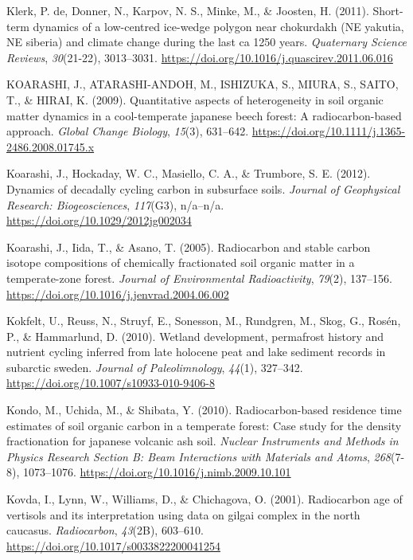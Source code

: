 \documentclass[]{article}
\begin{document}
\leavevmode\hypertarget{ref-de_Klerk_2011}{}%
Klerk, P. de, Donner, N., Karpov, N. S., Minke, M., \& Joosten, H.
(2011). Short-term dynamics of a low-centred ice-wedge polygon near
chokurdakh (NE yakutia, NE siberia) and climate change during the last
ca 1250 years. \emph{Quaternary Science Reviews}, \emph{30}(21-22),
3013--3031. \url{https://doi.org/10.1016/j.quascirev.2011.06.016}

\leavevmode\hypertarget{ref-KOARASHI_2009}{}%
KOARASHI, J., ATARASHI-ANDOH, M., ISHIZUKA, S., MIURA, S., SAITO, T., \&
HIRAI, K. (2009). Quantitative aspects of heterogeneity in soil organic
matter dynamics in a cool-temperate japanese beech forest: A
radiocarbon-based approach. \emph{Global Change Biology}, \emph{15}(3),
631--642. \url{https://doi.org/10.1111/j.1365-2486.2008.01745.x}

\leavevmode\hypertarget{ref-Koarashi_2012}{}%
Koarashi, J., Hockaday, W. C., Masiello, C. A., \& Trumbore, S. E.
(2012). Dynamics of decadally cycling carbon in subsurface soils.
\emph{Journal of Geophysical Research: Biogeosciences}, \emph{117}(G3),
n/a--n/a. \url{https://doi.org/10.1029/2012jg002034}

\leavevmode\hypertarget{ref-Koarashi_2005}{}%
Koarashi, J., Iida, T., \& Asano, T. (2005). Radiocarbon and stable
carbon isotope compositions of chemically fractionated soil organic
matter in a temperate-zone forest. \emph{Journal of Environmental
Radioactivity}, \emph{79}(2), 137--156.
\url{https://doi.org/10.1016/j.jenvrad.2004.06.002}

\leavevmode\hypertarget{ref-Kokfelt_2010}{}%
Kokfelt, U., Reuss, N., Struyf, E., Sonesson, M., Rundgren, M., Skog,
G., Rosén, P., \& Hammarlund, D. (2010). Wetland development, permafrost
history and nutrient cycling inferred from late holocene peat and lake
sediment records in subarctic sweden. \emph{Journal of Paleolimnology},
\emph{44}(1), 327--342. \url{https://doi.org/10.1007/s10933-010-9406-8}

\leavevmode\hypertarget{ref-Kondo_2010}{}%
Kondo, M., Uchida, M., \& Shibata, Y. (2010). Radiocarbon-based
residence time estimates of soil organic carbon in a temperate forest:
Case study for the density fractionation for japanese volcanic ash soil.
\emph{Nuclear Instruments and Methods in Physics Research Section B:
Beam Interactions with Materials and Atoms}, \emph{268}(7-8),
1073--1076. \url{https://doi.org/10.1016/j.nimb.2009.10.101}

\leavevmode\hypertarget{ref-Kovda_2001}{}%
Kovda, I., Lynn, W., Williams, D., \& Chichagova, O. (2001). Radiocarbon
age of vertisols and its interpretation using data on gilgai complex in
the north caucasus. \emph{Radiocarbon}, \emph{43}(2B), 603--610.
\url{https://doi.org/10.1017/s0033822200041254}
\end{document}
